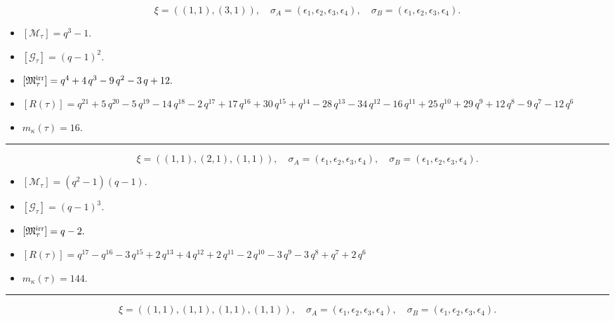 \documentclass[10pt,a4paper]{amsart}
\begin{document}
$$\xi = ({(1, 1)}, {(3, 1)}),\quad \sigma_A = ({{\epsilon_1}}, {{\epsilon_2, \epsilon_3, \epsilon_4}}),\quad \sigma_B = ({{\epsilon_1}}, {{\epsilon_2, \epsilon_3, \epsilon_4}}).$$

\begin{itemize}
 \item $[\mathcal{M}_{\tau}] = q^{3} - 1 .$

 \item $[\mathcal{G}_{\tau}] = {\left(q - 1\right)}^{2} .$

 \item $[{\frak M}_{\tau}^{\textrm{irr}}] = q^{4} + 4 \, q^{3} - 9 \, q^{2} - 3 \, q + 12 .$

 \item $[R(\tau)] = q^{21} + 5 \, q^{20} - 5 \, q^{19} - 14 \, q^{18} - 2 \, q^{17} + 17 \, q^{16} + 30 \, q^{15} + q^{14} - 28 \, q^{13} - 34 \, q^{12} - 16 \, q^{11} + 25 \, q^{10} + 29 \, q^{9} + 12 \, q^{8} - 9 \, q^{7} - 12 \, q^{6} $

 \item $m_{\kappa}(\tau) = 16 .$

 \end{itemize}
\noindent\rule{8cm}{0.4pt}

$$\xi = ({(1, 1)}, {(2, 1), (1, 1)}),\quad \sigma_A = ({{\epsilon_1}}, {{\epsilon_2, \epsilon_3}, {\epsilon_4}}),\quad \sigma_B = ({{\epsilon_1}}, {{\epsilon_2, \epsilon_3}, {\epsilon_4}}).$$

\begin{itemize}
 \item $[\mathcal{M}_{\tau}] = {\left(q^{2} - 1\right)} {\left(q - 1\right)} .$

 \item $[\mathcal{G}_{\tau}] = {\left(q - 1\right)}^{3} .$

 \item $[{\frak M}_{\tau}^{\textrm{irr}}] = q - 2 .$

 \item $[R(\tau)] = q^{17} - q^{16} - 3 \, q^{15} + 2 \, q^{13} + 4 \, q^{12} + 2 \, q^{11} - 2 \, q^{10} - 3 \, q^{9} - 3 \, q^{8} + q^{7} + 2 \, q^{6} $

 \item $m_{\kappa}(\tau) = 144 .$

 \end{itemize}
\noindent\rule{8cm}{0.4pt}

$$\xi = ({(1, 1)}, {(1, 1), (1, 1), (1, 1)}),\quad \sigma_A = ({{\epsilon_1}}, {{\epsilon_2}, {\epsilon_3}, {\epsilon_4}}),\quad \sigma_B = ({{\epsilon_1}}, {{\epsilon_2}, {\epsilon_3}, {\epsilon_4}}).$$
\end{document}
